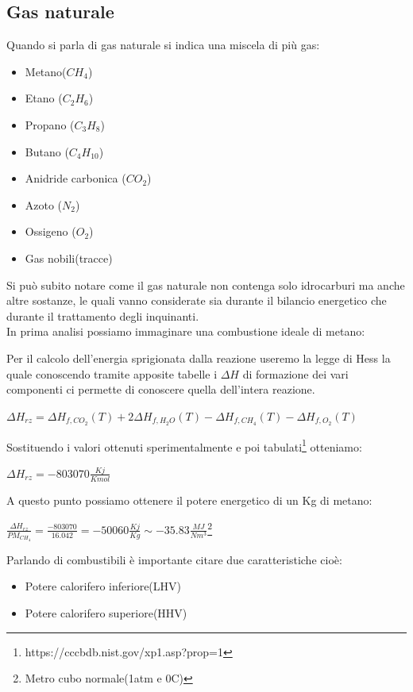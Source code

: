 \subsection{Gas naturale}
Quando si parla di gas naturale si indica una miscela di più gas:
\begin{itemize}
    \item Metano($C H_4$)
    \item Etano ($C_2 H_6$)
    \item Propano ($C_3 H_8$)
    \item Butano ($C_4 H_10$)
    \item Anidride carbonica ($C O_2$)
    \item Azoto ($N_2$)
    \item Ossigeno ($O_2$)
    \item Gas nobili(tracce)
\end{itemize}
Si può subito notare come il gas naturale non contenga solo idrocarburi ma anche altre sostanze, le quali vanno considerate sia durante il bilancio energetico che durante il trattamento degli inquinanti.\\
In prima analisi possiamo immaginare una combustione ideale di metano:
\begin{center}
\end{center}
Per il calcolo dell'energia sprigionata dalla reazione useremo la legge di Hess la quale conoscendo tramite apposite tabelle i $\Delta H$ di formazione dei vari componenti ci permette di conoscere quella dell'intera reazione.
\begin{center}
    \large{$\Delta H_{rz} = \Delta H_{f,CO_2}(T) + 2\Delta H_{f,H_2O}(T) - \Delta H_{f,CH_4}(T) - \Delta H_{f,O_2}(T) $}
\end{center}
Sostituendo i valori ottenuti sperimentalmente e poi tabulati\footnote{https://cccbdb.nist.gov/xp1.asp?prop=1} otteniamo:
\begin{center}
    \large{$\Delta H_{rz} = -803070\frac{Kj}{Kmol} $}
\end{center}
A questo punto possiamo ottenere il potere energetico di un Kg di metano:
\begin{center}
    \large{$\frac{\Delta H_{rz}}{PM_{CH_4}} = \frac{-803070}{16.042} = -50060 \frac{Kj}{Kg} \sim -35.83 \frac{MJ}{Nm^3}$\footnote{Metro cubo normale(1atm e 0\degree C)}}
\end{center}
\newpage\noindent
Parlando di combustibili è importante citare due caratteristiche cioè:
\begin{itemize}
    \item Potere calorifero inferiore(LHV)
    \item Potere calorifero superiore(HHV)
\end{itemize}

